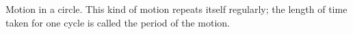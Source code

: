 Motion in a circle. This kind of motion repeats itself regularly; the length of
time taken for one cycle is called the period of the motion.